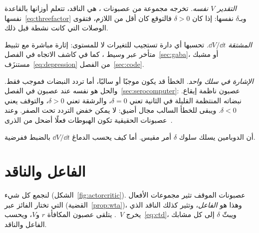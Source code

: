 \emph{التقدير $V$ نفسه.} تخرجه مجموعة من عصبونات ، هي الناقد، تتعلم أوزانها بالقاعدة نفسها~\eqref{eq:threefactor} وبـ$\delta$ نفسها: إذا كان $\delta>0$ فالتوقع كان أقل من اللازم، فتقوى الوصلات التي كانت نشطة قبل ذلك.

\emph{المشتقة $\dd V/\dd t$.} تحسبها أي دارة تستجيب للتغيرات لا للمستوى: إثارة مباشرة مع تثبيط متأخر عبر وسيط ، كما في كاشف الاتجاه في الفصل~\ref{sec:gaba}، أو مشبك مستنزَف~\eqref{eq:depression} من الفصل~\ref{sec:code}.

\emph{الإشارة في سلك واحد.} الخطأ قد يكون موجبًا أو سالبًا، أما تردد النبضات فموجب فقط. والحل هو نفسه عند عصبون  في الفصل~\ref{sec:serocomputer}: عصبون  ناظمة إيقاع. نبضاته المنتظمة القليلة في الثانية تعني $\delta=0$، والرشقة تعني $\delta>0$، والتوقف يعني $\delta<0$. ويبقى للخطأ السالب مجال أضيق: لا يمكن خفض التردد تحت الصفر. وعند عصبونات  الحقيقية تكون الهبوطات فعلًا أضحل من الذرى~\cite{Bayer2005}.

أن الدوبامين يسلك سلوك $\delta$ أمر مقيس. أما كيف يحسب الدماغ $\dd V/\dd t$ بالضبط ففرضية.

\section{الفاعل والناقد}

لنجمع كل شيء (الشكل~\ref{fig:actorcritic}). عصبونات الموقف تثير مجموعات الأفعال التي تختار الفائز عبر  (القضية~\ref{prop:wta})، وهذا هو \emph{الفاعل}، وتثير كذلك الناقد الذي يخرج $V$~\cite{SuttonBarto2018}. يتلقى عصبون  المكافأة $r$ و$V$، ويحسب~\eqref{eq:ctd}، ويبثّ $\delta$ إلى كل مشابك الفاعل والناقد.

